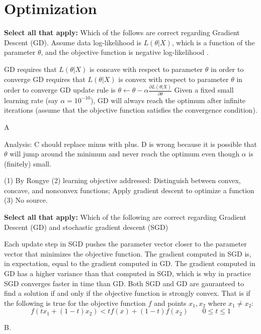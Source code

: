 \section{Optimization}
\begin{questions}
\question [] \textbf{Select all that apply:} Which of the follows are correct regarding Gradient Descent (GD). Assume data log-likelihood is $L(\theta|X)$, which is a function of the parameter $\theta$, and the objective function is negative log-likelihood .
    {%
    \checkboxchar{$\Box$} %
    \begin{checkboxes}
     \choice GD requires that $L(\theta|X)$ is concave with respect to parameter $\theta$ in order to converge
     \choice GD requires that $L(\theta|X)$ is convex with respect to parameter $\theta$ in order to converge
     \choice GD update rule is $\theta \leftarrow \theta - \alpha \frac{ \partial L(\theta|X)}{\partial \theta}$
     \choice Given a fixed small learning rate (say $ \alpha =10^{-10}$), GD will always reach the optimum after infinite iterations (assume that the objective function satisfies the convergence condition).
    \end{checkboxes}
    }
    \begin{soln}
    A
    
    Analysis:
    C should replace minus with plus. D is wrong because it is possible that $\theta$ will  jump around the minimum and never reach the optimum even though $\alpha$ is  (finitely) small.
    \end{soln}
    \begin{qauthor}
    (1) By Rongye 
    (2) learning objective addressed: Distinguish between convex, concave, and nonconvex functions; Apply gradient descent to optimize a function 
    (3) No source.
    \end{qauthor}

\question [] \textbf{Select all that apply:} Which of the following are correct regarding Gradient Descent (GD) and stochastic gradient descent (SGD)
    {%
    \checkboxchar{$\Box$} %
    \begin{checkboxes}
     \choice Each update step in SGD pushes the parameter vector closer to the parameter vector that minimizes the objective function.
     \choice The gradient computed in SGD is, in expectation, equal to the gradient computed in GD.
     \choice The gradient computed in GD has a higher variance than that computed in SGD, which is why in practice SGD converges faster in time than GD.
     \choice Both SGD and GD are gauranteed to find a solution if and only if the objective function is strongly convex. That is if the following is true for the objective function $f$ and points $x_1, x_2$ where $x_1 \neq x_2$:
     \[
        f(tx_1 + (1 - t)x_2) < tf(x) + (1-t)f(x_2)\qquad 0\leq t \leq 1
     \]
    \end{checkboxes}
    }
    \begin{soln}
    B.
    

\end{soln}
\end{questions}
